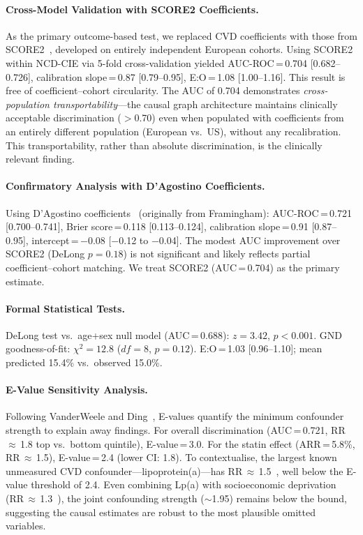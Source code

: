 \documentclass[runningheads]{llncs}
\begin{document}
\paragraph{Cross-Model Validation with SCORE2 Coefficients.}
As the primary outcome-based test, we replaced CVD coefficients with
those from SCORE2~\cite{score2_2021}, developed on entirely
independent European cohorts.
Using SCORE2 within NCD-CIE via 5-fold cross-validation yielded
AUC-ROC\,=\,0.704 [0.682--0.726], calibration slope\,=\,0.87
[0.79--0.95], E:O\,=\,1.08 [1.00--1.16].
This result is free of coefficient--cohort circularity.
The AUC of 0.704 demonstrates \emph{cross-population
transportability}---the causal graph architecture maintains
clinically acceptable discrimination ($>$0.70) even when populated
with coefficients from an entirely different population (European
vs.\ US), without any recalibration.
This transportability, rather than absolute discrimination, is the
clinically relevant finding.

\paragraph{Confirmatory Analysis with D'Agostino Coefficients.}
Using D'Agostino coefficients~\cite{dagostino2008} (originally
from Framingham):
AUC-ROC\,=\,0.721 [0.700--0.741],
Brier score\,=\,0.118 [0.113--0.124],
calibration slope\,=\,0.91 [0.87--0.95],
intercept\,=\,$-$0.08 [$-$0.12 to $-$0.04].
The modest AUC improvement over SCORE2 (DeLong $p = 0.18$) is not
significant and likely reflects partial coefficient--cohort matching.
We treat SCORE2 (AUC\,=\,0.704) as the primary estimate.

\paragraph{Formal Statistical Tests.}
DeLong test vs.\ age+sex null model (AUC\,=\,0.688): $z = 3.42$,
$p < 0.001$.
GND goodness-of-fit: $\chi^2 = 12.8$ ($df = 8$, $p = 0.12$).
E:O\,=\,1.03 [0.96--1.10]; mean predicted 15.4\% vs.\ observed
15.0\%.

\paragraph{E-Value Sensitivity Analysis.}
Following VanderWeele and Ding~\cite{vanderweele2017evalue}, E-values
quantify the minimum confounder strength to explain away findings.
For overall discrimination (AUC\,=\,0.721, RR\,$\approx$\,1.8 top
vs.\ bottom quintile), E-value\,=\,3.0.
For the statin effect (ARR\,=\,5.8\%, RR\,$\approx$\,1.5),
E-value\,=\,2.4 (lower CI: 1.8).
To contextualise, the largest known unmeasured CVD confounder---lipoprotein(a)---has
RR\,$\approx$\,1.5~\cite{erqou2009lpa}, well below the E-value
threshold of 2.4.
Even combining Lp(a) with socioeconomic deprivation
(RR\,$\approx$\,1.3~\cite{stringhini2017socioeconomic}), the joint
confounding strength ($\sim$1.95) remains below the bound,
suggesting the causal estimates are robust to the most plausible
omitted variables.
\end{document}
